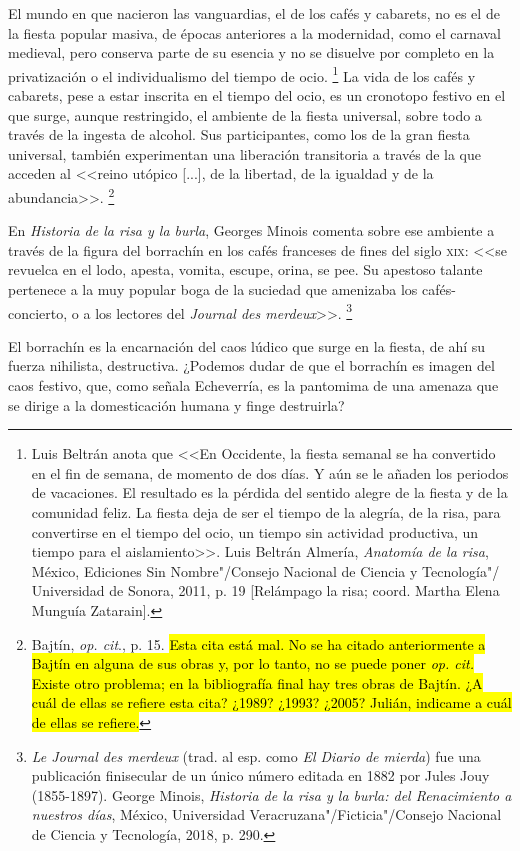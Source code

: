 \documentclass[14pt,twoside,final]{extbook} %
\let\oldfootnote\footnote
\renewcommand\footnote[1]{%
\oldfootnote{\hspace{1mm}#1}}
\begin{document}
El mundo en que nacieron las vanguardias, el de los cafés y cabarets, no es el de la fiesta popular masiva, de épocas anteriores a la modernidad, como el carnaval medieval, pero conserva parte de su esencia y no se disuelve por completo en la privatización o el individualismo del tiempo de ocio.\footnote{Luis Beltrán anota que <<En Occidente, la fiesta semanal se ha convertido en el fin de semana, de momento de dos días. Y aún se le añaden los periodos de vacaciones. El resultado es la pérdida del sentido alegre de la fiesta y de la comunidad feliz. La fiesta deja de ser el tiempo de la alegría, de la risa, para convertirse en el tiempo del ocio, un tiempo sin actividad productiva, un tiempo para el aislamiento>>. Luis Beltrán Almería, \emph{Anatomía de la risa}, México, Ediciones Sin Nombre"/Consejo Nacional
de Ciencia y Tecnología"/ Universidad de Sonora, 2011, p. 19 [Relámpago la risa; coord. Martha Elena Munguía Zatarain].} La vida de los cafés y cabarets, pese a estar inscrita en el tiempo del ocio, es un cronotopo festivo en el que surge, aunque restringido, el ambiente de la fiesta universal, sobre todo a través de la ingesta de alcohol. Sus participantes, como los de la gran fiesta universal, también experimentan una liberación transitoria a través de la que acceden al <<reino utópico [...], de la libertad, de la igualdad y de la abundancia>>.\footnote{Bajtín, \emph{op. cit}., p. 15. \hl{Esta cita está mal. No se ha citado anteriormente a Bajtín en alguna de sus obras y, por lo tanto, no se puede poner \emph{op. cit.} Existe otro problema; en la bibliografía final hay tres obras de Bajtín. ¿A cuál de ellas se refiere esta cita? ¿1989? ¿1993? ¿2005? Julián, indicame a cuál de ellas se refiere.}}

En \emph{Historia de la risa y la burla}, Georges Minois comenta sobre ese ambiente a través de la figura del borrachín en los cafés franceses de fines del siglo \textsc{xix}: <<se revuelca en el lodo, apesta, vomita, escupe, orina, se pee. Su apestoso talante pertenece a la muy popular boga de la suciedad que amenizaba los cafés-concierto, o a los lectores del \emph{Journal des merdeux}>>.\footnote{\emph{Le Journal des merdeux} (trad. al esp. como \emph{El Diario de mierda}) fue una publicación finisecular de un único número editada en 1882 por Jules Jouy (1855-1897). George Minois, \emph{Historia de la risa y la burla: del Renacimiento a nuestros días}, México, Universidad Veracruzana"/Ficticia"/Consejo Nacional de Ciencia y Tecnología, 2018, p. 290.}

El borrachín es la encarnación del caos lúdico que surge en la fiesta, de ahí su fuerza nihilista, destructiva. ¿Podemos dudar de que el borrachín es imagen del
caos festivo, que, como señala Echeverría, es la pantomima de una amenaza que se dirige a la domesticación humana y finge destruirla?
\end{document}
